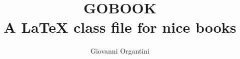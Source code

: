 \documentclass{gobook}
\begin{document}
\def\hbar{\mathit{^^^^0127}} %

\title{GOBOOK\\A \LaTeX{} class file for nice books}
\vspace{2cm}
\author{Giovanni Organtini}
\titlepage
\maketitle

\tableofcontents



\backmatter
\printindex
\end{document}
